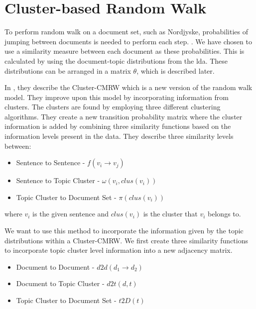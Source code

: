 \section{Cluster-based Random Walk}\label{sec:cluster_pagerank}
To perform random walk on a document set, such as Nordjyske, probabilities of jumping between documents is needed to perform each step. .
We have chosen to use a similarity measure between each document as these probabilities.
This is calculated by using the document-topic distributions from the \gls{lda}.
These distributions can be arranged in a matrix $\theta$, which is described later.

In \cite{ClusterPageRank}, they describe the \gls{Cluster-CMRW} which is a new version of the random walk model. 
They improve upon this model by incorporating information from clusters. 
The clusters are found by employing three different clustering algorithms.
They create a new transition probability matrix where the cluster information is added by combining three similarity functions based on the information levels present in the data.
They describe three similarity levels between:
\begin{itemize}
    \item Sentence to Sentence - $f(v_i \rightarrow v_j)$
    \item Sentence to Topic Cluster - $\omega(v_i, clus(v_i))$
    \item Topic Cluster to Document Set - $\pi(clus(v_i))$
\end{itemize}
where $v_i$ is the given sentence and $clus(v_i)$ is the cluster that $v_i$ belongs to.

We want to use this method to incorporate the information given by the topic distributions within a \gls{Cluster-CMRW}. 
We first create three similarity functions to incorporate topic cluster level information into a new adjacency matrix.
\begin{itemize}
    \item Document to Document - $d2d(d_1 \rightarrow d_2)$
    \item Document to Topic Cluster - $d2t(d,t)$
    \item Topic Cluster to Document Set - $t2D(t)$
\end{itemize}

